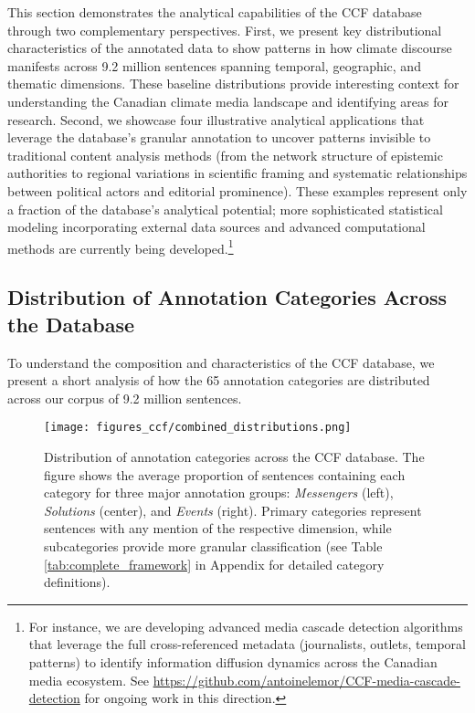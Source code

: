 \documentclass[12pt]{article}
\begin{document}
This section demonstrates the analytical capabilities of the CCF database through two complementary perspectives. First, we present key distributional characteristics of the annotated data to show patterns in how climate discourse manifests across 9.2 million sentences spanning temporal, geographic, and thematic dimensions. These baseline distributions provide interesting context for understanding the Canadian climate media landscape and identifying areas for research. Second, we showcase four illustrative analytical applications that leverage the database's granular annotation to uncover patterns invisible to traditional content analysis methods (from the network structure of epistemic authorities to regional variations in scientific framing and systematic relationships between political actors and editorial prominence). These examples represent only a fraction of the database's analytical potential; more sophisticated statistical modeling incorporating external data sources and advanced computational methods are currently being developed.\footnote{For instance, we are developing advanced media cascade detection algorithms that leverage the full cross-referenced metadata (journalists, outlets, temporal patterns) to identify information diffusion dynamics across the Canadian media ecosystem. See \url{https://github.com/antoinelemor/CCF-media-cascade-detection} for ongoing work in this direction.}

\subsection{Distribution of Annotation Categories Across the Database}

To understand the composition and characteristics of the CCF database, we present a short analysis of how the 65 annotation categories are distributed across our corpus of 9.2 million sentences.

\begin{figure}[b!]
\centering
\texttt{[image: figures\_ccf/combined\_distributions.png]}
\caption{Distribution of annotation categories across the CCF database. The figure shows the average proportion of sentences containing each category for three major annotation groups: \emph{Messengers} (left), \emph{Solutions} (center), and \emph{Events} (right). Primary categories represent sentences with any mention of the respective dimension, while subcategories provide more granular classification (see Table \ref{tab:complete_framework} in Appendix for detailed category definitions).}
\label{fig:combined_distributions}
\end{figure}
\end{document}
